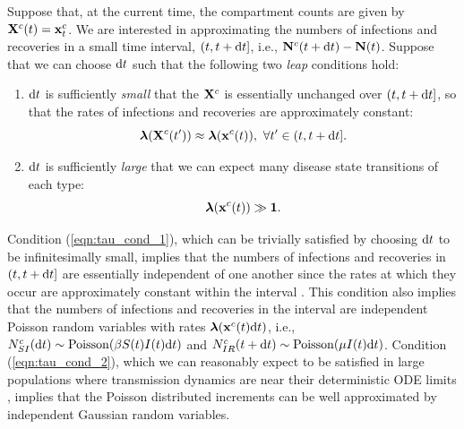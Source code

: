 Suppose that, at the current time, the compartment counts are given by $ \mathbf{X}^c(t) = \mathbf{x}^c_t $. We are interested in approximating the numbers of infections and recoveries in a small time interval, $ (t, t+\mathrm{d} t] $, i.e., $ \mathbf{N}^c(t+\mathrm{d} t) - \mathbf{N}(t)$. Suppose that we can choose $ \mathrm{d} t $ such that the following two \textit{leap} conditions hold:
\begin{enumerate}
	\item $ \mathrm{d} t $ is sufficiently \textit{small} that the $ \mathbf{X}^c $ is essentially unchanged over $ (t,t+\mathrm{d} t] $, so that the rates of infections and recoveries are approximately constant: 
	\begin{equation}\label{eqn:tau_cond_1}
	\boldsymbol{\lambda}(\mathbf{X}^c(t^\prime)) \approx \boldsymbol{\lambda}(\mathbf{x}^c(t)),\ \forall t^\prime \in (t,t+\mathrm{d} t].
	\end{equation}
	\item $ \mathrm{d} t $ is sufficiently \textit{large} that we can expect many disease state transitions of each type:
	\begin{equation}\label{eqn:tau_cond_2}
	\boldsymbol{\lambda}(\mathbf{x}^c(t)) \gg \boldsymbol{1}.
	\end{equation}
\end{enumerate}
Condition (\ref{eqn:tau_cond_1}), which can be trivially satisfied by choosing $ \mathrm{d} t $ to be infinitesimally small, implies that the numbers of infections and recoveries in $ (t,t+\mathrm{d} t] $ are essentially independent of one another since the rates at which they occur are approximately constant within the interval \cite{gillespie2000chemical}. This condition also implies that the numbers of infections and recoveries in the interval are independent Poisson random variables with rates $ \boldsymbol{\lambda}(\mathbf{x}^c(t)\mathrm{d} t) $, i.e., $ N^c_{SI}(\mathrm{d} t) \sim \mathrm{Poisson}(\beta S(t)I(t)\mathrm{d} t) $ and $ N^c_{IR}(t+\mathrm{d} t) \sim \mathrm{Poisson}(\mu I(t)\mathrm{d} t) $. Condition (\ref{eqn:tau_cond_2}), which we can reasonably expect to be satisfied in large populations where transmission dynamics are near their deterministic ODE limits \cite{wallace2012linear}, implies that the Poisson distributed increments can be well approximated by independent Gaussian random variables. 

